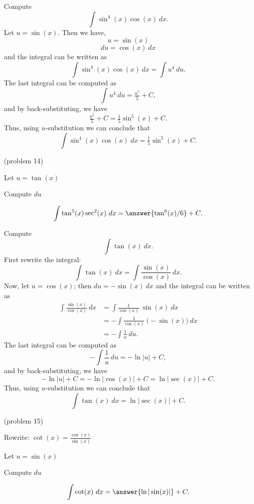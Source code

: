 \documentclass{ximera}
\begin{document}
\begin{example}[example 14] Compute 
\[\int \sin^4(x)\cos(x) \ dx.\]
Let $u = \sin(x)$. Then we have,
\[u = \sin(x)\]
\[du = \cos(x) \ dx\]
and the integral can be written as 
\[\int \sin^4(x)\cos(x) \ dx  = \int u^4 \ du.\]
The last integral can be computed as 
\[\int u^4 \ du = \tfrac{u^5}{5} + C,\]
and by back-substituting, we have 
\[\tfrac{u^5}{5} + C = \tfrac15 \sin^5(x) + C.\]
Thus, using $u$-substitution we can conclude that
\[\int \sin^4(x)\cos(x) \ dx =  \tfrac15 \sin^5(x) + C.\]
\end{example}



\begin{problem}(problem 14)
\begin{hint}
Let $u = \tan(x)$
\end{hint}
\begin{hint}
Compute $du$
\end{hint}
\[\int \tan^5(x)\sec^2(x) \ dx = \answer{\tan^6(x)/6} +C.\]
\end{problem}

\begin{example}[example 15] Compute 
\[\int \tan(x) \ dx.\]
First rewrite the integral:
\[\int \tan(x) \ dx =\int \frac{\sin(x)}{\cos(x)} \ dx.\]
Now, let $u = \cos(x)$; then $du = -\sin(x) \ dx$
and the integral can be written as
\begin{align*}
\int \frac{\sin(x)}{\cos(x)} \ dx &= \int \frac{1}{\cos(x)}\ \sin(x) \  dx \\
 &=  - \int \frac{1}{\cos(x)}\ \big(-\sin(x)\big) \  dx\\
&=-\int \frac{1}{u} \ du.
\end{align*}
The last integral can be computed as 
\[-\int \frac{1}{u} \ du = -\ln|u| + C,\]
and by back-substituting, we have 
\[-\ln|u| + C = -\ln|\cos(x)| + C = \ln|\sec(x)| +C.\]
Thus, using $u$-substitution we can conclude that
\[\int \tan(x) \ dx =  \ln|\sec(x)| + C.\]
\end{example}

\begin{problem}(problem 15)
\begin{hint}
Rewrite: $\cot(x) = \frac{\cos(x)}{\sin(x)}$
\end{hint}
\begin{hint}
Let $u = \sin(x)$
\end{hint}
\begin{hint}
Compute $du$
\end{hint}
\[\int \cot(x) \ dx = \answer{\ln|\sin(x)|} +C.\]


\end{problem}
\end{document}
